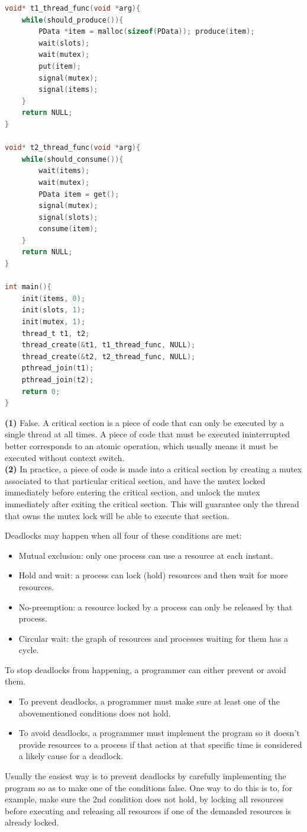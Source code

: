 \documentclass{sope}
\begin{document}
{\begin{lstlisting}[language=C]
void* t1_thread_func(void *arg){
    while(should_produce()){
        PData *item = malloc(sizeof(PData)); produce(item);
        wait(slots);
        wait(mutex);
        put(item);
        signal(mutex);
        signal(items);
    }
    return NULL;
}

void* t2_thread_func(void *arg){
    while(should_consume()){
        wait(items);
        wait(mutex);
        PData item = get();
        signal(mutex);
        signal(slots);
        consume(item);
    }
    return NULL;
}

int main(){
    init(items, 0);
    init(slots, 1);
    init(mutex, 1);
    thread_t t1, t2;
    thread_create(&t1, t1_thread_func, NULL);
    thread_create(&t2, t2_thread_func, NULL);
    pthread_join(t1);
    pthread_join(t2);
    return 0;
}
\end{lstlisting}

\textbf{(1)} False. A critical section is a piece of code that can only be executed by a single thread at all times. A piece of code that must be executed ininterrupted better corresponds to an atomic operation, which usually means it must be executed without context switch.\\
\textbf{(2)} In practice, a piece of code is made into a critical section by creating a mutex associated to that particular critical section, and have the mutex locked immediately before entering the critical section, and unlock the mutex immediately after exiting the critical section. This will guarantee only the thread that owns the mutex lock will be able to execute that section.

Deadlocks may happen when all four of these conditions are met:
\begin{itemize}
    \item Mutual exclusion: only one process can use a resource at each instant.
    \item Hold and wait: a process can lock (hold) resources and then wait for more resources.
    \item No-preemption: a resource locked by a process can only be released by that process.
    \item Circular wait: the graph of resources and processes waiting for them has a cycle.
\end{itemize}
To stop deadlocks from happening, a programmer can either prevent or avoid them.
\begin{itemize}
    \item To prevent deadlocks, a programmer must make sure at least one of the abovementioned conditions does not hold.
    \item To avoid deadlocks, a programmer must implement the program so it doesn't provide resources to a process if that action at that specific time is considered a likely cause for a deadlock.
\end{itemize}
Usually the easiest way is to prevent deadlocks by carefully implementing the program so as to make one of the conditions false. One way to do this is to, for example, make sure the 2nd condition does not hold, by locking all resources before executing and releasing all resources if one of the demanded resources is already locked.

}
\end{document}
